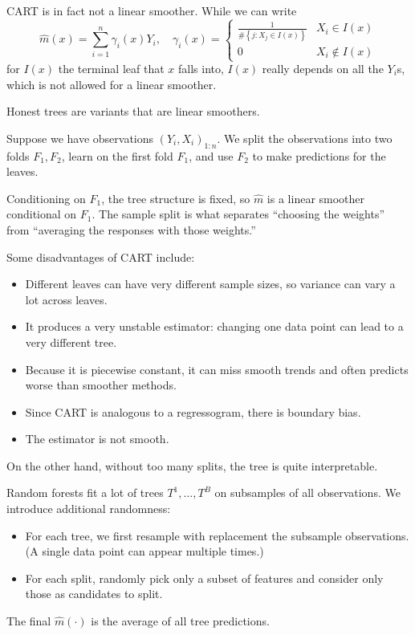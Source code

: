 CART is in fact not a linear smoother. While we can write \[
	\hat{m}(x) = \sum\limits_{i=1}^{n} \gamma_i(x) Y_i, \quad \gamma_i(x) = \begin{cases}
		\frac{1}{\# \left\{j : X_j \in I(x)\right\}} & X_i \in I(x) \\
		0 & X_i \notin I(x)
	\end{cases}
\]
for $I(x)$ the terminal leaf that $x$ falls into, $I(x)$ really depends on all the $Y_i$s, which is not allowed for a linear smoother.

Honest trees are variants that are linear smoothers.
\begin{definition}
	Suppose we have observations $\left( Y_i,X_i \right)_{1:n}$. We split the observations into two folds $F_1,F_2$, learn on the first fold $F_1$, and use $F_2$ to make predictions for the leaves.
\end{definition}
Conditioning on $F_1$, the tree structure is fixed, so $\hat{m}$ is a linear smoother conditional on $F_1$. The sample split is what separates ``choosing the weights'' from ``averaging the responses with those weights.''

\begin{remark}
	Some disadvantages of CART include:
	\begin{itemize}
		\item Different leaves can have very different sample sizes, so variance can vary a lot across leaves.
		\item It produces a very unstable estimator: changing one data point can lead to a very different tree.
		\item Because it is piecewise constant, it can miss smooth trends and often predicts worse than smoother methods.
		\item Since CART is analogous to a regressogram, there is boundary bias.
		\item The estimator is not smooth.
	\end{itemize}

	On the other hand, without too many splits, the tree is quite interpretable.
\end{remark}

\begin{definition}
	Random forests fit a lot of trees $T^1,\ldots,T^B$ on subsamples of all observations. We introduce additional randomness:
	\begin{itemize}
		\item For each tree, we first resample with replacement the subsample observations. (A single data point can appear multiple times.)
		\item For each split, randomly pick only a subset of features and consider only those as candidates to split.
	\end{itemize}
	The final $\hat{m}(\cdot )$ is the average of all tree predictions.
\end{definition}

